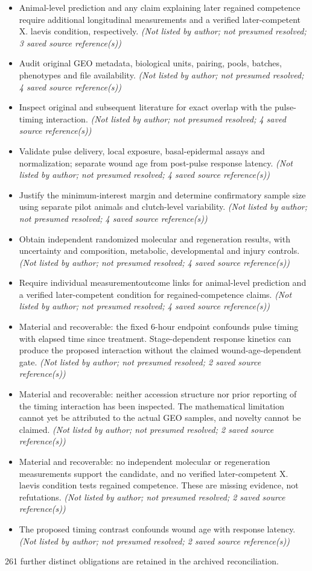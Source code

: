 \documentclass[11pt]{article}
\begin{document}
\begin{itemize}
\item Animal-level prediction and any claim explaining later regained competence require additional longitudinal measurements and a verified later-competent X. laevis condition, respectively. \textit{ (Not listed by author; not presumed resolved; 3 saved source reference(s))}
\item Audit original GEO metadata, biological units, pairing, pools, batches, phenotypes and file availability. \textit{ (Not listed by author; not presumed resolved; 4 saved source reference(s))}
\item Inspect original and subsequent literature for exact overlap with the pulse-timing interaction. \textit{ (Not listed by author; not presumed resolved; 4 saved source reference(s))}
\item Validate pulse delivery, local exposure, basal-epidermal assays and normalization; separate wound age from post-pulse response latency. \textit{ (Not listed by author; not presumed resolved; 4 saved source reference(s))}
\item Justify the minimum-interest margin and determine confirmatory sample size using separate pilot animals and clutch-level variability. \textit{ (Not listed by author; not presumed resolved; 4 saved source reference(s))}
\item Obtain independent randomized molecular and regeneration results, with uncertainty and composition, metabolic, developmental and injury controls. \textit{ (Not listed by author; not presumed resolved; 4 saved source reference(s))}
\item Require individual measurement\textendash{}outcome links for animal-level prediction and a verified later-competent condition for regained-competence claims. \textit{ (Not listed by author; not presumed resolved; 4 saved source reference(s))}
\item Material and recoverable: the fixed 6-hour endpoint confounds pulse timing with elapsed time since treatment. Stage-dependent response kinetics can produce the proposed interaction without the claimed wound-age-dependent gate. \textit{ (Not listed by author; not presumed resolved; 2 saved source reference(s))}
\item Material and recoverable: neither accession structure nor prior reporting of the timing interaction has been inspected. The mathematical limitation cannot yet be attributed to the actual GEO samples, and novelty cannot be claimed. \textit{ (Not listed by author; not presumed resolved; 2 saved source reference(s))}
\item Material and recoverable: no independent molecular or regeneration measurements support the candidate, and no verified later-competent X. laevis condition tests regained competence. These are missing evidence, not refutations. \textit{ (Not listed by author; not presumed resolved; 2 saved source reference(s))}
\item The proposed timing contrast confounds wound age with response latency. \textit{ (Not listed by author; not presumed resolved; 2 saved source reference(s))}
\end{itemize}
261 further distinct obligations are retained in the archived reconciliation.
\end{document}
